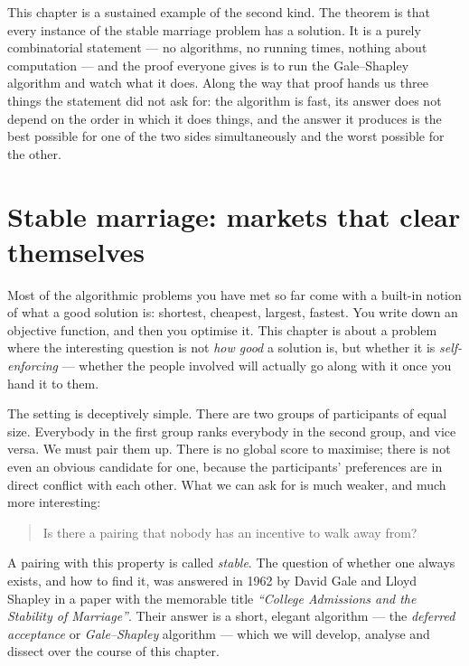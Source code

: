 This chapter is a sustained example of the second kind. The theorem is that
every instance of the stable marriage problem has a solution. It is a purely
combinatorial statement --- no algorithms, no running times, nothing about
computation --- and the proof everyone gives is to run the Gale--Shapley
algorithm and watch what it does. Along the way that proof hands us three
things the statement did not ask for: the algorithm is fast, its answer does not
depend on the order in which it does things, and the answer it produces is the
best possible for one of the two sides simultaneously and the worst possible for
the other.

\section{Stable marriage: markets that clear themselves}

Most of the algorithmic problems you have met so far come with a built-in
notion of what a good solution is: shortest, cheapest, largest, fastest. You
write down an objective function, and then you optimise it. This chapter is
about a problem where the interesting question is not \emph{how good} a
solution is, but whether it is \emph{self-enforcing} --- whether the people
involved will actually go along with it once you hand it to them.

The setting is deceptively simple. There are two groups of participants of
equal size. Everybody in the first group ranks everybody in the second group,
and vice versa. We must pair them up. There is no global score to maximise;
there is not even an obvious candidate for one, because the participants'
preferences are in direct conflict with each other. What we can ask for is
much weaker, and much more interesting:

\begin{quote}
Is there a pairing that nobody has an incentive to walk away from?
\end{quote}

A pairing with this property is called \emph{stable}. The question of whether
one always exists, and how to find it, was answered in 1962 by David Gale and
Lloyd Shapley in a paper with the memorable title \emph{``College Admissions
and the Stability of Marriage''}. Their answer is a
short, elegant algorithm --- the \emph{deferred acceptance} or
\emph{Gale--Shapley} algorithm --- which we will develop, analyse and dissect
over the course of this chapter.

